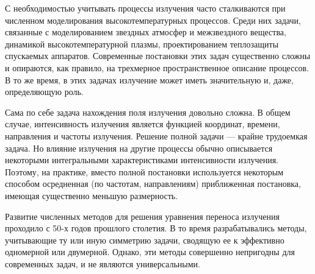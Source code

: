 \intro
С необходимостью учитывать процессы излучения часто сталкиваются при численном моделирования высокотемпературных процессов. Среди них задачи, связанные с моделированием звездных атмосфер и межзвездного вещества, динамикой высокотемпературной плазмы, проектированием теплозащиты спускаемых аппаратов. Современные постановки этих задач существенно сложны и опираются, как правило, на трехмерное пространственное описание процессов. В то же время, в этих задачах излучение может иметь значительную и, даже, определяющую роль.

Сама по себе задача нахождения поля излучения довольно сложна. В общем случае, интенсивность излучения является функцией координат, времени, направления и частоты излучения. Решение полной задачи — крайне трудоемкая задача. Но влияние излучения на другие процессы обычно описывается некоторыми интегральными характеристиками интенсивности излучения. Поэтому, на практике, вместо полной постановки используется некоторым способом осредненная (по частотам, направлениям) приближенная постановка, имеющая существенно меньшую размерность.

Развитие численных методов для решения уравнения переноса излучения проходило с 50-х годов прошлого столетия. В то время разрабатывались методы, учитывающие ту или иную симметрию задачи, сводящую ее к эффективно одномерной или двумерной. Однако, эти методы совершенно непригодны для современных задач, и не являются универсальными.